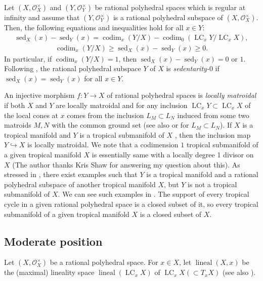 \documentclass[a4paper,dvipdfmx,reqno,12pt]{amsart}
\theoremstyle{definition}
\newcommand{\opn}[1]{\operatorname{#1}}
\newcommand{\hookto}{\hookrightarrow}
\numberwithin{equation}{section}
\begin{document}
Let $(X,\mathcal{O}_X^{\times})$ and 
$(Y,\mathcal{O}_Y^{\times})$ be rational
polyhedral spaces which is regular at infinity and
assume that $(Y,\mathcal{O}_Y^{\times})$
is a rational polyhedral subspace of
$(X,\mathcal{O}_X^{\times})$. 
Then, the following equations and inequalities hold
for all $x\in Y$:
\begin{align}
\opn{sed}_X(x)-\opn{sed}_Y(x)=
\opn{codim}_x(Y/X)-\opn{codim}_0(\opn{LC}_x Y/\opn{LC}_xX),
\end{align}
\begin{align}
\opn{codim}_x(Y/X) \geq 
\opn{sed}_X(x)-\opn{sed}_Y(x)\geq 0.
\end{align}
In particular, if $\opn{codim}_x(Y/X)=1$,
then $\opn{sed}_X(x)-\opn{sed}_Y(x)=0$ or $1$.
Following \cite[]{demedrano2023chern},
the rational polyhedral subspace $Y$ of $X$ is
\emph{sedentarity-$0$} if
$\opn{sed}_X(x)=\opn{sed}_Y(x)$ for all
$x\in Y$. 



An injective morphism $f\colon Y\to X$ of rational polyhedral spaces
is \emph{locally matroidal} if both $X$ and $Y$ are locally matroidal
and for any inclusion $\opn{LC}_x Y\subset \opn{LC}_x X$ of
the local cones at $x$ comes from the inclusion
$L_M\subset L_N$ induced from some two matroids $M,N$ with
the common ground set
(see also \cite[]{MR3041763} or \cite[]{MR3032930}
for $L_M\subset L_N$).  
If $X$ is a tropical manifold and $Y$ is a tropical submanifold of $X$
\cite[Definition 2.14]{demedrano2023chern},
then the inclusion map $Y\hookto X$ is locally matroidal. 
We note that a codimension $1$ tropical submanifold of a given
tropical manifold $X$ is essentially same with
a locally degree 1 divisor on $X$
\cite[Definition 4.3]{shaw2015tropical}
(The author thanks Kris Shaw for answering my question about this).
As stressed in \cite[Example 2.15]{demedrano2023chern},
there exist examples such that $Y$ is a tropical manifold and
a rational polyhedral subspace of another tropical manifold
$X$, but $Y$ is not a tropical submanifold of $X$.
We can see such examples in \cite{MR2594592,MR3339531,shaw2015tropical}.
The support of every tropical cycle in a given
rational polyhedral space is
a closed subset of it,
so every tropical submanifold of a given
tropical manifold $X$ is a closed subset of $X$.

\subsection{Moderate position}
Let $(X,\mathcal{O}_X^{\times})$ be a rational polyhedral space.
For $x\in X$, let 
$\opn{lineal}(X,x)$ be the (maximal) lineality space
$\opn{lineal}(\opn{LC}_x X)$ of 
$\opn{LC}_x X (\subset T_x X)$ \cite[]{MR4246795}
(see also \cite[]{demedrano2023chern}).
\end{document}
